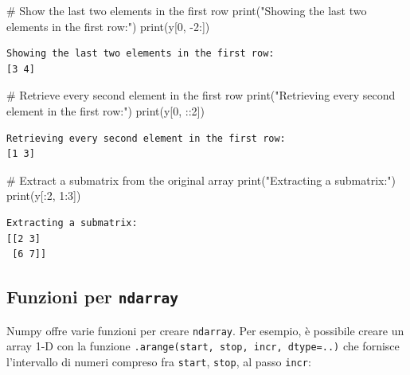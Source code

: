 \documentclass[
  letterpaper,
  krantz2]{{[}./krantz{]}}
\newenvironment{Shaded}{\begin{snugshade}}{\end{snugshade}}
\newcommand{\BuiltInTok}[1]{\textcolor[rgb]{0.00,0.23,0.31}{#1}}
\newcommand{\CommentTok}[1]{\textcolor[rgb]{0.37,0.37,0.37}{#1}}
\newcommand{\DecValTok}[1]{\textcolor[rgb]{0.68,0.00,0.00}{#1}}
\newcommand{\NormalTok}[1]{\textcolor[rgb]{0.00,0.23,0.31}{#1}}
\newcommand{\OperatorTok}[1]{\textcolor[rgb]{0.37,0.37,0.37}{#1}}
\newcommand{\StringTok}[1]{\textcolor[rgb]{0.13,0.47,0.30}{#1}}
\begin{document}
\begin{Shaded}
\begin{Highlighting}[]
\CommentTok{\# Show the last two elements in the first row}
\BuiltInTok{print}\NormalTok{(}\StringTok{"Showing the last two elements in the first row:"}\NormalTok{)}
\BuiltInTok{print}\NormalTok{(y[}\DecValTok{0}\NormalTok{, }\OperatorTok{{-}}\DecValTok{2}\NormalTok{:])}
\end{Highlighting}
\end{Shaded}

\begin{verbatim}
Showing the last two elements in the first row:
[3 4]
\end{verbatim}

\begin{Shaded}
\begin{Highlighting}[]
\CommentTok{\# Retrieve every second element in the first row}
\BuiltInTok{print}\NormalTok{(}\StringTok{"Retrieving every second element in the first row:"}\NormalTok{)}
\BuiltInTok{print}\NormalTok{(y[}\DecValTok{0}\NormalTok{, ::}\DecValTok{2}\NormalTok{])}
\end{Highlighting}
\end{Shaded}

\begin{verbatim}
Retrieving every second element in the first row:
[1 3]
\end{verbatim}

\begin{Shaded}
\begin{Highlighting}[]
\CommentTok{\# Extract a submatrix from the original array}
\BuiltInTok{print}\NormalTok{(}\StringTok{"Extracting a submatrix:"}\NormalTok{)}
\BuiltInTok{print}\NormalTok{(y[:}\DecValTok{2}\NormalTok{, }\DecValTok{1}\NormalTok{:}\DecValTok{3}\NormalTok{])}
\end{Highlighting}
\end{Shaded}

\begin{verbatim}
Extracting a submatrix:
[[2 3]
 [6 7]]
\end{verbatim}

\subsection{\texorpdfstring{Funzioni per
\texttt{ndarray}}{Funzioni per ndarray}}\label{funzioni-per-ndarray}

Numpy offre varie funzioni per creare \texttt{ndarray}. Per esempio, è
possibile creare un array 1-D con la funzione
\texttt{.arange(start,\ stop,\ incr,\ dtype=..)} che fornisce
l'intervallo di numeri compreso fra \texttt{start}, \texttt{stop}, al
passo \texttt{incr}:
\end{document}
